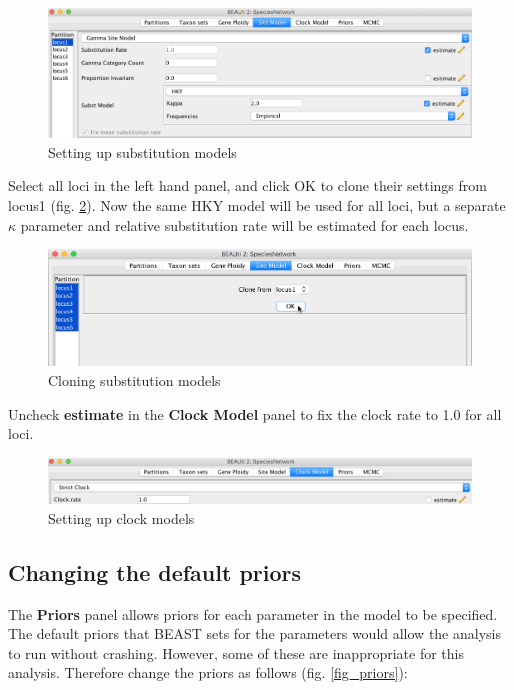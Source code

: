 \documentclass[11pt]{article}
\begin{document}
\begin{figure}[h]
\center
\includegraphics[width=1.0\textwidth]{figs/fig5_sitemodel.png}
\caption{Setting up substitution models}
\label{fig_sitemodel}
\end{figure}

Select all loci in the left hand panel, and click OK to clone their settings from locus1 (fig. \ref{fig_cloneSiteModel}). Now the same HKY model will be used for all loci, but a separate $\kappa$
parameter and relative substitution rate will be estimated for each locus.

\begin{figure}[h]
\center
\includegraphics[width=1.0\textwidth]{figs/cloneSiteModel.png}
\caption{Cloning substitution models}
\label{fig_cloneSiteModel}
\end{figure}

Uncheck \textbf{estimate} in the \textbf{Clock Model} panel to fix the clock rate to 1.0 for all loci.

\begin{figure}[h]
\center
\includegraphics[width=1.0\textwidth]{figs/fig6_clockmodel.png}
\caption{Setting up clock models}
\label{fig_clockmodel}
\end{figure}

\subsection*{Changing the default priors}

The \textbf{Priors} panel allows priors for each parameter in the model to be specified. The default priors that BEAST sets for the parameters would allow the analysis to run without crashing. However, some of these are inappropriate for this analysis. Therefore change the priors as follows (fig. \ref{fig_priors}):
\end{document}
